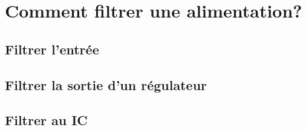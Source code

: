 
\section{Comment filtrer une alimentation?}

\subsection{Filtrer l'entrée}
\subsection{Filtrer la sortie d'un régulateur}
\subsection{Filtrer au IC}